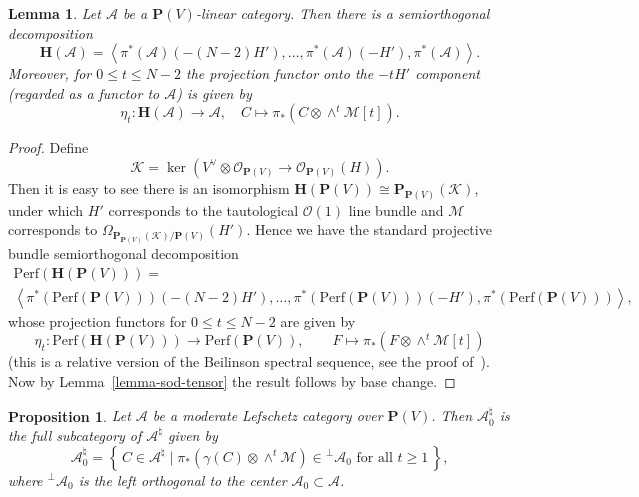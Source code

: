 \documentclass[11pt, reqno]{amsart}
\numberwithin{equation}{section}
\theoremstyle{plain}
\newtheorem{lemma}[theorem]{Lemma}
\newtheorem{proposition}[theorem]{Proposition}
\theoremstyle{definition}
\newcommand{\st}{\mid}
\newcommand{\set}[1]{\left\{ \, #1 \, \right\}}
\newcommand{\Perf}{\mathrm{Perf}}
\newcommand{\hpd}{{\natural}}
\newcommand{\svee}{\scriptscriptstyle\vee}
\newcommand{\cAd}{\cA^\hpd}
\newcommand{\llangle}{\left \langle}
\newcommand{\rrangle}{\right \rangle}
\newcommand{\cO}{\mathcal{O}}
\newcommand{\cA}{\mathcal{A}}
\newcommand{\cK}{\mathcal{K}}
\newcommand{\cM}{\mathcal{M}}
\newcommand{\bH}{\mathbf{H}}
\newcommand{\bP}{\mathbf{P}}
\begin{document}
\begin{lemma}
\label{lemma-HC-sod-Pbundle} 
Let $\cA$ be a $\bP(V)$-linear category. 
Then there is a semiorthogonal decomposition 
\begin{equation*}
\bH(\cA) = \llangle 
\pi^*(\cA)(-(N-2)H'), \dots, \pi^*(\cA)(-H'), \pi^*(\cA) 
\rrangle  . 
\end{equation*}
Moreover, for $0 \leq t \leq N-2$ the projection functor onto the $-tH'$ component 
\textup(regarded as a functor to $\cA$\textup) is given by 
\begin{equation*}
\eta_t \colon  \bH(\cA) \to \cA,
\quad
C \mapsto \pi_*(C \otimes \wedge^t \cM[t]). 
\end{equation*}
\end{lemma}

\begin{proof}
Define  
\begin{equation*}
\cK = \ker(V^{\svee} \otimes \cO_{\bP(V)} \to \cO_{\bP(V)}(H)). 
\end{equation*}
Then it is easy to see there is an isomorphism $\bH(\bP(V)) \cong \bP_{\bP(V)}(\cK)$, 
under which $H'$ corresponds to the tautological $\cO(1)$ line bundle 
and $\cM$ corresponds to $\Omega_{{\bP_{\bP(V)}(\cK)}/\bP(V)}(H')$. 
Hence we have the standard projective bundle semiorthogonal 
decomposition 
\begin{multline*}
\Perf(\bH(\bP(V))) =  \\
\llangle 
\pi^*(\Perf(\bP(V)))(-(N-2)H'), \dots, \pi^*(\Perf(\bP(V)))(-H'), \pi^*(\Perf(\bP(V))) 
\rrangle , 
\end{multline*}
whose projection functors for $0 \leq t \leq N-2$ are given by 
\begin{equation*}
\eta_t \colon \Perf(\bH(\bP(V))) \to \Perf(\bP(V)),
\qquad
F \mapsto \pi_*(F \otimes \wedge^t \cM[t])
\end{equation*}
(this is a relative version of the Beilinson spectral sequence, see the proof of~\cite[Theorem~2.6]{orlov1992projective}).
Now by Lemma~\ref{lemma-sod-tensor} the result follows by base change. 
\end{proof}


\begin{proposition}
\label{proposition-characterization-Ad0}
Let $\cA$ be a moderate Lefschetz category over $\bP(V)$.
Then $\cAd_0$ is the full subcategory of $\cAd$ given by 
\begin{equation*}
\cAd_0 = \set{ 
C \in \cAd \st 
\pi_*(\gamma(C) \otimes \wedge^t \cM) \in {}^\perp\cA_0 \text{ for all } t \geq 1
} , 
\end{equation*} 
where ${}^\perp\cA_0$ is the left orthogonal to the center $\cA_0 \subset \cA$. 
\end{proposition}
\end{document}

